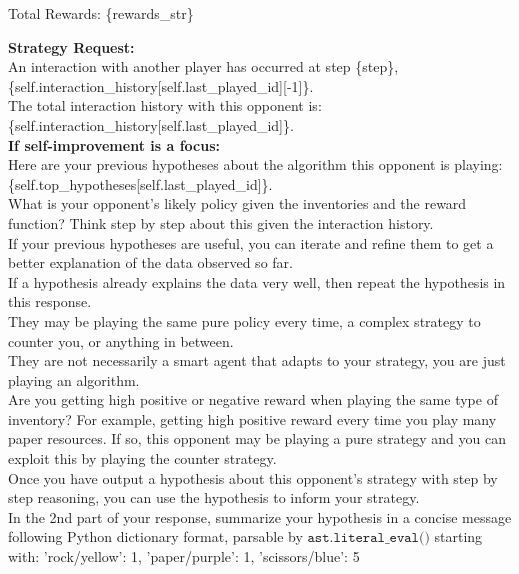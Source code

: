 \documentclass{article} %
\begin{document}
\begin{tcolorbox}[
    title={\small \textbf{ToM Module User Message 2}},
    width=\linewidth, %
    fontupper=\fontsize{9pt}{11pt}\selectfont\ttfamily %
]
Total Rewards: \{rewards\_str\}

\textbf{Strategy Request:}\\
An interaction with another player has occurred at step \{step\}, \{self.interaction\_history[self.last\_played\_id][-1]\}.\\
The total interaction history with this opponent is: \{self.interaction\_history[self.last\_played\_id]\}.\\
\textbf{If self-improvement is a focus:}\\
Here are your previous hypotheses about the algorithm this opponent is playing: \{self.top\_hypotheses[self.last\_played\_id]\}.\\
What is your opponent's likely policy given the inventories and the reward function? Think step by step about this given the interaction history.\\
If your previous hypotheses are useful, you can iterate and refine them to get a better explanation of the data observed so far.\\
If a hypothesis already explains the data very well, then repeat the hypothesis in this response.\\
They may be playing the same pure policy every time, a complex strategy to counter you, or anything in between.\\
They are not necessarily a smart agent that adapts to your strategy, you are just playing an algorithm.\\
Are you getting high positive or negative reward when playing the same type of inventory? For example, getting high positive reward every time you play many paper resources. If so, this opponent may be playing a pure strategy and you can exploit this by playing the counter strategy.\\
Once you have output a hypothesis about this opponent's strategy with step by step reasoning, you can use the hypothesis to inform your strategy.\\
In the 2nd part of your response, summarize your hypothesis in a concise message following Python dictionary format, parsable by $\texttt{ast.literal\_eval()}$ starting with:
'rock/yellow': 1, 'paper/purple': 1, 'scissors/blue': 5


\end{tcolorbox}
\end{document}
